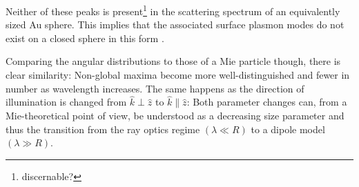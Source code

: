 \documentclass[10pt]{article}
\begin{document}
\begin{multicols}{2}
Neither of these peaks is present\footnote{discernable?} in the scattering spectrum of an equivalently sized Au sphere. 
This implies that  the associated surface plasmon modes do not exist on a closed sphere in this form . 


Comparing the angular distributions to those of a Mie particle though, there is clear similarity: 
Non-global maxima become more well-distinguished and fewer in number as wavelength increases. 
The same happens as the direction of illumination is changed from $\hat{k}\perp\hat{z}$ to $\hat{k}\parallel\hat{z}$: 
Both parameter changes can, from a Mie-theoretical point of view, be understood as a decreasing size parameter and thus the transition from the ray optics regime $\left( \lambda \ll R \right)$ to a dipole model $\left( \lambda \gg R \right)$. 








\end{multicols}
\end{document}

